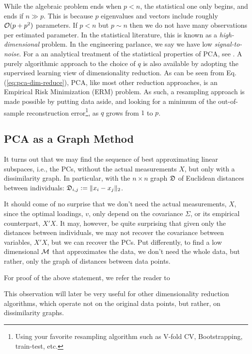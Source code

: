 \documentclass[12pt,a4paper]{article}
\begin{document}
While the algebraic problem ends when $p<n$, the statistical one only begins, and ends if $n \gg p$. 
This is because $p$ eigenvalues and vectors include roughly $\mathcal{O}(p+p^2)$ parameters. 
If $p<n$ but $p\sim n$ then we do not have many observations per estimated parameter. 
In the statistical literature, this is known as a \emph{high-dimensional} problem. 
In the engineering parlance, we say we have low \emph{signal-to-noise}.
For a an analytical treatment of the statistical properties of PCA, see \cite{nadler2008finite}.
A purely algorithmic approach to the choice of $q$ is also available by adopting the supervised learning view of dimensionality reduction.
As can be seen from Eq.(\ref{eq:pca-dim-reduce}), PCA, like most other reduction approaches, is an Empirical Risk Minimization (ERM) problem.
As such, a resampling approach is made possible by putting data aside, and looking for a minimum of the out-of-sample reconstruction error\footnote{Using your favorite resampling algorithm such as V-fold CV, Bootstrapping, train-test, etc.}, as $q$ grows from $1$ to $p$. 


 


\subsection{PCA as a Graph Method}
\label{sec:pca_as_graph}

It turns out that we may find the sequence of best approximating linear subspaces, i.e., the PCs, without the actual measurements $X$, but only with a dissimilarity graph. 
In particular, with the $n\times n$ graph $\mathfrak{D}$ of Euclidean distances between individuals: $\mathfrak{D}_{i,j}:= \Vert x_i-x_j \Vert_2$. 

It should come of no surprise that we don't need the actual measurements, $X$, since the optimal loadings, $v$, only depend on the covariance $\Sigma$, or its empirical counterpart, $X'X$. 
It may, however, be quite surprising that given only the distances between individuals, we may not recover the covariance between variables, $X'X$, but we can recover the PCs. 
Put differently, to find a low dimensional $\mathcal{M}$ that approximates the data, we don't need the whole data, but rather, only the graph of distances between data points. 

For proof of the above statement, we refer the reader to \citet[Sec.18.5.2]{friedman2001elements}

This observation will later be very useful for other dimensionality reduction algorithms, which operate not on the original data points, but rather, on dissimilarity graphs. 
\end{document}
